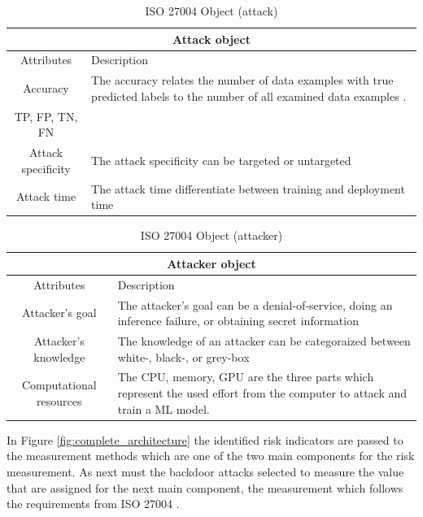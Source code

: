 \begin{table}[h]
\centering
  \begin{tabular}{|c|p{10cm}|}
  \hline
  \multicolumn{2}{|c|}{Attack object} \\
  \hline
  \rowcolor{lightgray} Attributes & Description \\ [0.5ex]
  \hline
  Accuracy & The accuracy relates the number of data examples with true predicted labels to the number of all examined data examples \cite{9783960101925}. \\
  \hline
  TP, FP, TN, FN & \\
  \hline
  Attack specificity & The attack specificity can be targeted or untargeted \\
  \hline
  Attack time & The attack time differentiate between training and deployment time \\
  \hline
  \end{tabular}
\caption{ISO 27004 Object (attack)}
\label{tab:attack}
\end{table}

\begin{table}[h]
\centering
  \begin{tabular}{| c | p{10cm} |}
  \hline
  \multicolumn{2}{|c|}{Attacker object} \\
  \hline
  \rowcolor{lightgray} Attributes & Description \\ [0.5ex]
  \hline
  Attacker's goal & The attacker's goal can be a denial-of-service, doing an inference failure, or obtaining secret information \\
  \hline
  Attacker's knowledge & The knowledge of an attacker can be categoraized between white-, black-, or grey-box \\
  \hline
  Computational resources & The CPU, memory, GPU are the three parts which represent the used effort from the computer to attack and train a ML model. \\
  \hline
  \end{tabular}
\caption{ISO 27004 Object (attacker)}
\label{tab:attacker}
\end{table}

In Figure \ref{fig:complete_architecture} the identified risk indicators are passed to the measurement methods which are one of the two main components for the risk measurement. As next must the backdoor attacks selected to measure the value that are assigned for the next main component, the measurement which follows the requirements from ISO 27004 \cite{ISO_27004_2009}.

